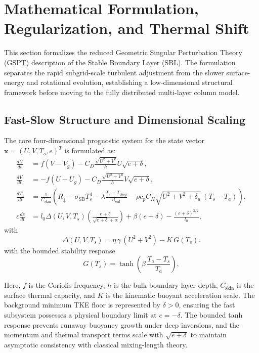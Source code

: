 \documentclass[11pt,letterpaper]{article}
\begin{document}
\section{Mathematical Formulation, Regularization, and Thermal Shift}
\label{sec:mathematical_formulation}

This section formalizes the reduced Geometric Singular Perturbation Theory (GSPT) description of the Stable Boundary Layer (SBL). The formulation separates the rapid subgrid-scale turbulent adjustment from the slower surface-energy and rotational evolution, establishing a low-dimensional structural framework before moving to the fully distributed multi-layer column model.

\subsection{Fast-Slow Structure and Dimensional Scaling}
\label{subsec:mathematical_fast_slow}

The core four-dimensional prognostic system for the state vector $\mathbf{x} = (U, V, T_s, e)^T$ is formulated as:
\begin{equation}
\begin{aligned}
\frac{dU}{dt} &= f(V - V_g) - C_D \frac{\sqrt{U^2+V^2}}{h} U \sqrt{e+\delta}, \\
\frac{dV}{dt} &= -f(U - U_g) - C_D \frac{\sqrt{U^2+V^2}}{h} V \sqrt{e+\delta}, \\
\frac{dT_s}{dt} &= \frac{1}{C_{\text{skin}}}\left(R_{\downarrow} - \sigma_{\text{SB}}T_s^4 - \lambda\frac{T_s - T_{\text{deep}}}{d_{\text{soil}}} - \rho c_p C_H\sqrt{U^2+V^2+\delta_u}\,(T_s - T_a)\right), \\
\varepsilon\frac{de}{dt} &= l_0\Delta(U,V,T_s)\left(\frac{e+\delta}{\sqrt{e+\delta}+\alpha}\right)+\beta(e+\delta)-\frac{(e+\delta)^{3/2}}{l_0},
\end{aligned}
\label{eq:mathematical_full_system}
\end{equation}
with
\begin{equation}
\Delta(U,V,T_s)=\eta\,\gamma\,(U^2+V^2)-K\,G(T_s).
\end{equation}
with the bounded stability response
\begin{equation}
G(T_s)=\tanh\!\left(\beta\,\frac{T_a-T_s}{T_a}\right),
\end{equation}

Here, $f$ is the Coriolis frequency, $h$ is the bulk boundary layer depth, $C_{\text{skin}}$ is the surface thermal capacity, and $K$ is the kinematic buoyant acceleration scale. The background minimum TKE floor is represented by $\delta > 0$, ensuring the fast subsystem possesses a physical boundary limit at $e = -\delta$. The bounded tanh response prevents runaway buoyancy growth under deep inversions, and the momentum and thermal transport terms scale with $\sqrt{e+\delta}$ to maintain asymptotic consistency with classical mixing-length theory.
\end{document}
